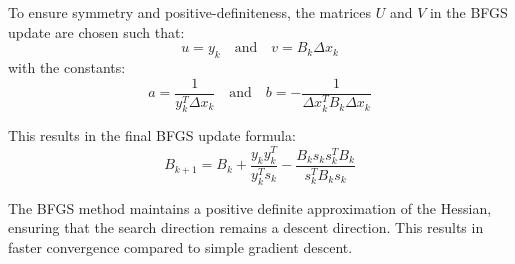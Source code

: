 \documentclass{article}
\begin{document}
To ensure symmetry and positive-definiteness, the matrices \( U \) and \( V \) in the BFGS update are chosen such that:
\begin{equation}
u = y_k \quad \text{and} \quad v = B_k \Delta x_k
\end{equation}
with the constants:
\begin{equation}
a = \frac{1}{y_k^T \Delta x_k} \quad \text{and} \quad b = -\frac{1}{\Delta x_k^T B_k \Delta x_k}
\end{equation}

This results in the final BFGS update formula:
\begin{equation}
B_{k+1} = B_k + \frac{y_k y_k^T}{y_k^T s_k} - \frac{B_k s_k s_k^T B_k}{s_k^T B_k s_k}
\end{equation}

The BFGS method maintains a positive definite approximation of the Hessian, ensuring that the search direction remains a descent direction. This results in faster convergence compared to simple gradient descent.
\end{document}
